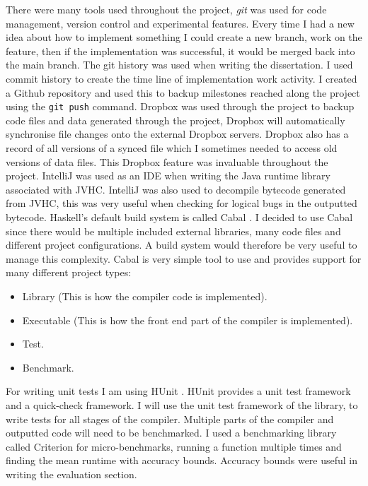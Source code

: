 \documentclass[float=false, crop=false]{standalone}
\begin{document}
There were many tools used throughout the project, \textit{git} was used for 
code management, version control and experimental features. Every time
I had a new idea about how to implement something I could create a new 
branch, work on the feature, then if the implementation was successful, 
it would be merged back into the main branch. 
The git history was used when writing the dissertation.
I used commit history to create the time line
of implementation work activity. 
I created a Github repository and used this to backup milestones reached 
along the project using the \verb|git push| command.
Dropbox was used through the project to backup code files and data generated 
through the project, Dropbox will automatically synchronise file changes
onto the external Dropbox servers. Dropbox also has a record of all
versions of a synced file which I sometimes needed to access old versions
of data files. This Dropbox feature was invaluable throughout the project.
IntelliJ \cite{intellij-ide} was used as an IDE when writing the Java
runtime library associated with JVHC. IntelliJ was also used to decompile
bytecode generated from JVHC, this was very useful when checking for logical
bugs in the outputted bytecode.
Haskell's default build system is called Cabal \cite{cabal}. I 
decided to use Cabal since there would be multiple included external libraries,
many code files and different project configurations.
A build system would therefore be very useful to manage this
complexity. Cabal is very simple tool to use and provides support
for many different project types:
  \begin{itemize}
    \item Library (This is how the compiler code is implemented).

    \item Executable (This is how the front end part of the compiler is 
      implemented).

    \item Test.

    \item Benchmark.
  \end{itemize}
For writing unit tests I am using HUnit \cite{hunit}.
HUnit provides a unit test framework and a quick-check framework. 
I will use the unit test framework of the library, 
to write tests for all stages of the compiler.
Multiple parts of the compiler and outputted code will
need to be benchmarked. I used a benchmarking library called
Criterion \cite{criterion} for micro-benchmarks, running a function
multiple times and finding the mean runtime with accuracy bounds.
Accuracy bounds were useful in writing the evaluation section.
\end{document}
